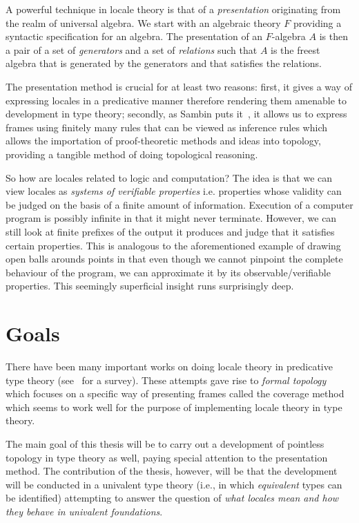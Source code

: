 \documentclass{article}
\begin{document}
A powerful technique in locale theory is that of a \emph{presentation} originating from
the realm of universal algebra. We start with an algebraic theory $F$ providing a
syntactic specification for an algebra. The presentation of an $F$-algebra $A$ is then a
pair of a set of \emph{generators} and a set of \emph{relations} such that $A$ is the
freest algebra that is generated by the generators and that satisfies the relations.

The presentation method is crucial for at least two reasons: first, it gives a way of
expressing locales in a predicative manner therefore rendering them amenable to
development in type theory; secondly, as Sambin puts it~\cite{sambin:2007}, it allows us
to express frames using finitely many rules that can be viewed as inference rules which
allows the importation of proof-theoretic methods and ideas into topology, providing a
tangible method of doing topological reasoning.

So how are locales related to logic and computation? The idea is that we can view locales
as \emph{systems of verifiable properties} i.e. properties whose validity can be judged on
the basis of a finite amount of information. Execution of a computer program is possibly
infinite in that it might never terminate. However, we can still look at finite prefixes
of the output it produces and judge that it satisfies certain properties. This is
analogous to the aforementioned example of drawing open balls arounds points in that even
though we cannot pinpoint the complete behaviour of the program, we can approximate it by
its observable/verifiable properties. This seemingly superficial insight runs surprisingly
deep.

\section{Goals}\label{sec:goals}

There have been many important works on doing locale theory in predicative type theory
(see~\cite{sambin:2007} for a survey). These attempts gave rise to \emph{formal topology}
which focuses on a specific way of presenting frames called the coverage method which
seems to work well for the purpose of implementing locale theory in type theory.

The main goal of this thesis will be to carry out a development of pointless topology in
type theory as well, paying special attention to the presentation method. The contribution
of the thesis, however, will be that the development will be conducted in a univalent type
theory (i.e., in which \emph{equivalent} types can be identified) attempting to answer the
question of \emph{what locales mean and how they behave in univalent foundations}.
\end{document}
